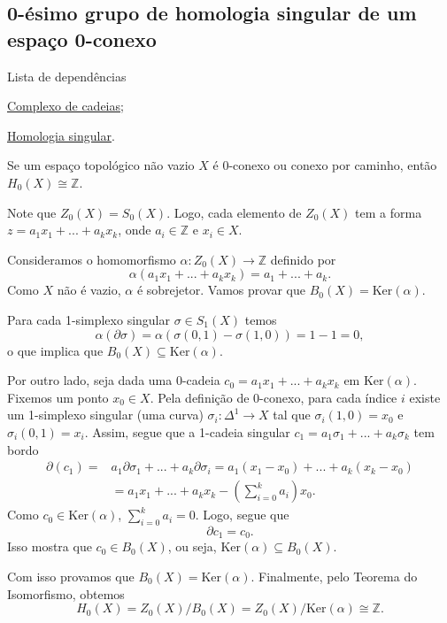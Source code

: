 \subsection{0-ésimo grupo de homologia singular de um espaço 0-conexo} %
\label{0-esimo-grupo-de-homologia-de-espaco-zero-conexo-prop}
\begin{titlemize}{Lista de dependências}
	\item \hyperref[complexo-de-cadeias-def]{Complexo de cadeias};\\ 
    \item \hyperref[homologia-singular-def]{Homologia singular}.
\end{titlemize}

\begin{prop}
    Se um espaço topológico não vazio $X$ é 0-conexo ou conexo por caminho, então $H_0(X)\cong \mathbb{Z}$.
\end{prop}
\begin{dem}
    Note que $Z_0(X)=S_0(X)$. Logo, cada elemento de $Z_0(X)$ tem a forma $z=a_1x_1+...+a_kx_k$, onde $a_i\in \mathbb{Z}$ e $x_i\in X$.

    Consideramos o homomorfismo $\alpha:Z_0(X)\rightarrow \mathbb{Z}$ definido por 
    \[\alpha (a_1x_1+...+a_kx_k)=a_1+...+a_k.\]
    Como $X$ não é vazio, $\alpha$ é sobrejetor. Vamos provar que $B_0(X)=\text{Ker}(\alpha)$.

    Para cada 1-simplexo singular $\sigma\in S_1(X)$ temos 
    \[\alpha(\partial \sigma)=\alpha(\sigma(0,1)-\sigma(1,0))=1-1=0,\]
    o que implica que $B_0(X)\subseteq \text{Ker}(\alpha)$. 
    
    Por outro lado, seja dada uma 0-cadeia $c_0=a_1x_1+...+a_kx_k$ em $\text{Ker}(\alpha)$. Fixemos um ponto $x_0\in X$. Pela definição de 0-conexo, para cada índice $i$ existe um 1-simplexo singular (uma curva) $\sigma_i:\Delta^1\rightarrow X$ tal que $\sigma_i (1,0)=x_0$ e $\sigma_i(0,1)=x_i$. Assim, segue que a 1-cadeia singular $c_1=a_1\sigma_1+...+a_k\sigma_k$ tem bordo 
    \begin{align*}
        \partial(c_1)=&a_1\partial \sigma_1+...+a_k\partial\sigma_i=a_1 (x_1-x_0)+...+a_k (x_k-x_0)\\
        &=a_1x_1+...+a_kx_k -(\sum_{i=0}^k a_i)x_0.
    \end{align*}
    Como $c_0\in \text{Ker}(\alpha)$, $\sum_{i=0}^k a_i=0$. Logo, segue que 
    \[\partial c_1=c_0.\]
    Isso mostra que $c_0\in B_0(X)$, ou seja, $\text{Ker}(\alpha)\subseteq B_0(X).$

    Com isso provamos que $B_0(X)=\text{Ker}(\alpha)$. Finalmente, pelo Teorema do Isomorfismo, obtemos
    \[H_0(X)=Z_0(X)/B_0(X)=Z_0(X)/\text{Ker}(\alpha)\cong \mathbb{Z}.\]
\end{dem}

